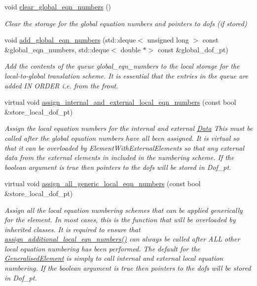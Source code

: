 \begin{DoxyCompactItemize}
void \hyperlink{classoomph_1_1GeneralisedElement_a75da2bf85ec82c9d59cbb2e06f82b9a1}{clear\+\_\+global\+\_\+eqn\+\_\+numbers} ()
\begin{DoxyCompactList}\small\item\em Clear the storage for the global equation numbers and pointers to dofs (if stored) \end{DoxyCompactList}\item 
void \hyperlink{classoomph_1_1GeneralisedElement_a540a363b1ea07065dd2ed1b223d0e4c4}{add\+\_\+global\+\_\+eqn\+\_\+numbers} (std\+::deque$<$ unsigned long $>$ const \&global\+\_\+eqn\+\_\+numbers, std\+::deque$<$ double $\ast$$>$ const \&global\+\_\+dof\+\_\+pt)
\begin{DoxyCompactList}\small\item\em Add the contents of the queue global\+\_\+eqn\+\_\+numbers to the local storage for the local-\/to-\/global translation scheme. It is essential that the entries in the queue are added IN O\+R\+D\+ER i.\+e. from the front. \end{DoxyCompactList}\item 
virtual void \hyperlink{classoomph_1_1GeneralisedElement_aa4884467f33b95c17e2e57e592ccd480}{assign\+\_\+internal\+\_\+and\+\_\+external\+\_\+local\+\_\+eqn\+\_\+numbers} (const bool \&store\+\_\+local\+\_\+dof\+\_\+pt)
\begin{DoxyCompactList}\small\item\em Assign the local equation numbers for the internal and external \hyperlink{classoomph_1_1Data}{Data} This must be called after the global equation numbers have all been assigned. It is virtual so that it can be overloaded by Element\+With\+External\+Elements so that any external data from the external elements in included in the numbering scheme. If the boolean argument is true then pointers to the dofs will be stored in Dof\+\_\+pt. \end{DoxyCompactList}\item 
virtual void \hyperlink{classoomph_1_1GeneralisedElement_a35dfba78813087c1070c9fd1a69824e5}{assign\+\_\+all\+\_\+generic\+\_\+local\+\_\+eqn\+\_\+numbers} (const bool \&store\+\_\+local\+\_\+dof\+\_\+pt)
\begin{DoxyCompactList}\small\item\em Assign all the local equation numbering schemes that can be applied generically for the element. In most cases, this is the function that will be overloaded by inherited classes. It is required to ensure that \hyperlink{classoomph_1_1GeneralisedElement_a4cdd0d1eef33b43f652c8f0b9e43967b}{assign\+\_\+additional\+\_\+local\+\_\+eqn\+\_\+numbers()} can always be called after A\+LL other local equation numbering has been performed. The default for the \hyperlink{classoomph_1_1GeneralisedElement}{Generalised\+Element} is simply to call internal and external local equation numbering. If the boolean argument is true then pointers to the dofs will be stored in Dof\+\_\+pt. \end{DoxyCompactList}\item 
$$
\end{DoxyCompactItemize}

